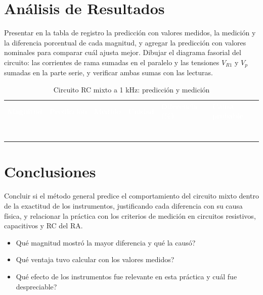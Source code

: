 \documentclass[12pt]{article}
\begin{document}
\section{Análisis de Resultados}\label{sec:analisis}
Presentar en la tabla de registro la predicción con valores medidos, la medición y la diferencia porcentual de cada magnitud, y agregar la predicción con valores nominales para comparar cuál ajusta mejor.
\lineablanco
Dibujar el diagrama fasorial del circuito: las corrientes de rama sumadas en el paralelo y las tensiones $V_{R1}$ y $V_p$ sumadas en la parte serie, y verificar ambas sumas con las lecturas.
\begin{table}[H]
  \centering
  \caption{Circuito RC mixto a 1 kHz: predicción y medición}
  \label{tab:registro-1}
  \begin{tabularx}{\linewidth}{>{\raggedright\arraybackslash}X>{\raggedright\arraybackslash}X>{\raggedright\arraybackslash}X>{\raggedright\arraybackslash}X>{\raggedright\arraybackslash}X>{\raggedright\arraybackslash}X}
    \rowcolor{iubnavy} \textcolor{white}{\textbf{Magnitud}} & \textcolor{white}{\textbf{Predicción}} & \textcolor{white}{\textbf{Medido}} & \textcolor{white}{\textbf{Unidad}} & \textcolor{white}{\textbf{Diferencia (\%)}} & \textcolor{white}{\textbf{Causa probable}} \\
    \rule{0pt}{0.8cm} & & & & & \\
    \rowcolor{iubfondogris} \rule{0pt}{0.8cm} & & & & & \\
    \rule{0pt}{0.8cm} & & & & & \\
    \rowcolor{iubfondogris} \rule{0pt}{0.8cm} & & & & & \\
    \rule{0pt}{0.8cm} & & & & & \\
    \rowcolor{iubfondogris} \rule{0pt}{0.8cm} & & & & & \\
    \rule{0pt}{0.8cm} & & & & & \\
    \bottomrule
  \end{tabularx}
\end{table}

\section{Conclusiones}\label{sec:conclusiones}
Concluir si el método general predice el comportamiento del circuito mixto dentro de la exactitud de los instrumentos, justificando cada diferencia con su causa física, y relacionar la práctica con los criterios de medición en circuitos resistivos, capacitivos y RC del RA.
\lineablanco
\begin{itemize}
  \item \textquestiondown{}Qué magnitud mostró la mayor diferencia y qué la causó?
  \item \textquestiondown{}Qué ventaja tuvo calcular con los valores medidos?
  \item \textquestiondown{}Qué efecto de los instrumentos fue relevante en esta práctica y cuál fue despreciable?
\end{itemize}
\end{document}
